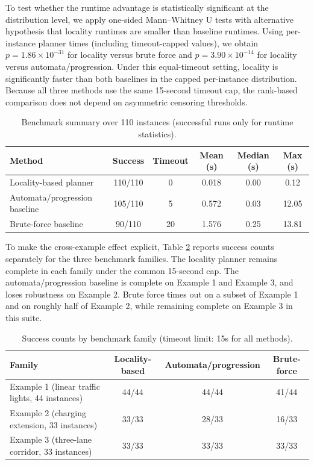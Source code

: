 \documentclass[a4paper,fleqn]{cas-dc}
\begin{document}
To test whether the runtime advantage is statistically significant at the distribution level, we apply one-sided Mann--Whitney U tests with alternative hypothesis that locality runtimes are smaller than baseline runtimes. Using per-instance planner times (including timeout-capped values), we obtain $p=1.86\times 10^{-31}$ for locality versus brute force and $p=3.90\times 10^{-14}$ for locality versus automata/progression. Under this equal-timeout setting, locality is significantly faster than both baselines in the capped per-instance distribution.
Because all three methods use the same 15-second timeout cap, the rank-based comparison does not depend on asymmetric censoring thresholds.

\begin{table}[ht!]
\centering
\caption{Benchmark summary over 110 instances (successful runs only for runtime statistics).}
\label{t:eval}
\begin{tabular}{lccccc}
\toprule
Method & Success & Timeout & Mean (s) & Median (s) & Max (s) \\
\midrule
Locality-based planner & 110/110 & 0 & 0.018 & 0.00 & 0.12 \\
Automata/progression baseline & 105/110 & 5 & 0.572 & 0.03 & 12.05 \\
Brute-force baseline & 90/110 & 20 & 1.576 & 0.25 & 13.81 \\
\bottomrule
\end{tabular}
\end{table}

To make the cross-example effect explicit, Table \ref{t:eval-families} reports success counts separately for the three benchmark families. The locality planner remains complete in each family under the common 15-second cap. The automata/progression baseline is complete on Example 1 and Example 3, and loses robustness on Example 2. Brute force times out on a subset of Example 1 and on roughly half of Example 2, while remaining complete on Example 3 in this suite.

\begin{table}[ht!]
\centering
\caption{Success counts by benchmark family (timeout limit: 15s for all methods).}
\label{t:eval-families}
\begin{tabular}{lccc}
\toprule
Family & Locality-based & Automata/progression & Brute-force \\
\midrule
Example 1 (linear traffic lights, 44 instances) & 44/44 & 44/44 & 41/44 \\
Example 2 (charging extension, 33 instances) & 33/33 & 28/33 & 16/33 \\
Example 3 (three-lane corridor, 33 instances) & 33/33 & 33/33 & 33/33 \\
\bottomrule
\end{tabular}
\end{table}
\end{document}
